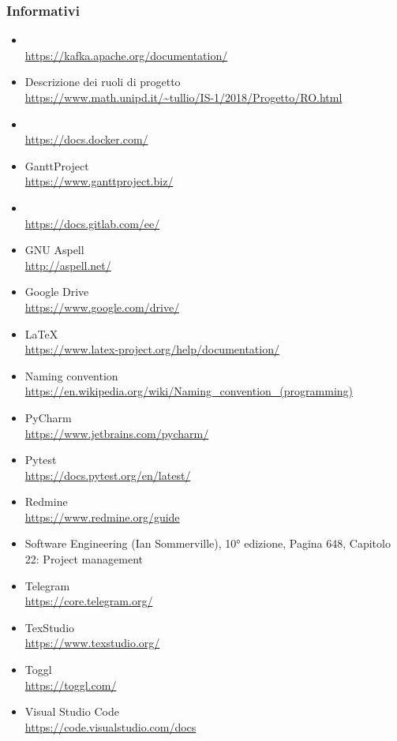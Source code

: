     \subsubsection{Informativi}	\label{rifinfo}
    \begin{itemize}
		\item {} \\\url{https://kafka.apache.org/documentation/}
        \item Descrizione dei ruoli di progetto \\\url{https://www.math.unipd.it/~tullio/IS-1/2018/Progetto/RO.html}
		\item {} \\\url{https://docs.docker.com/}
        \item GanttProject \\\url{https://www.ganttproject.biz/}
		\item {} \\\url{https://docs.gitlab.com/ee/}
		\item GNU Aspell \\\url{http://aspell.net/}
        \item Google Drive \\\url{https://www.google.com/drive/}
		\item \LaTeX\ \\\url{https://www.latex-project.org/help/documentation/}
        \item Naming convention \\\url{https://en.wikipedia.org/wiki/Naming_convention_(programming)}
        \item PyCharm \\\url{https://www.jetbrains.com/pycharm/}
		\item Pytest \\\url{https://docs.pytest.org/en/latest/}
		\item Redmine \\\url{https://www.redmine.org/guide}
        \item Software Engineering (Ian Sommerville), 10° edizione,
        Pagina 648, Capitolo 22: Project management
		\item Telegram \\\url{https://core.telegram.org/}
        \item TexStudio \\\url{https://www.texstudio.org/}
        \item Toggl \\\url{https://toggl.com/}
        \item Visual Studio Code \\\url{https://code.visualstudio.com/docs}
	\end{itemize}
